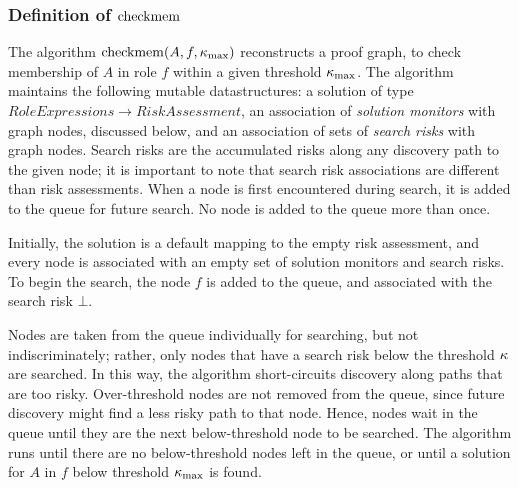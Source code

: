\subsubsection{Definition of $\mathrm{checkmem}$}

\newcommand{\threshold}{\risk_{\mathrm{max}}}

The algorithm $\checkmem(A,f,\threshold)$ reconstructs a proof graph,
to check membership of $A$ in role $f$ within a given threshold
$\threshold$.  The algorithm maintains the following mutable
datastructures: a solution of type $\mathit{RoleExpressions}
\rightarrow \mathit{RiskAssessment}$, an association of \emph{solution
monitors} with graph nodes, discussed below, and an association of
sets of \emph{search risks} with graph nodes.  Search risks are the
accumulated risks along any discovery path to the given node; it is
important to note that search risk associations are different than
risk assessments.  When a node is first encountered during search, it
is added to the queue for future search.  No node is added to the
queue more than once.

Initially, the solution is a default mapping to the empty risk
assessment, and every node is associated with an empty set of solution
monitors and search risks.  To begin the search, the node $f$ is added
to the queue, and associated with the search risk $\bot$.

Nodes are taken from the queue individually for searching, but not
indiscriminately; rather, only nodes that have a search risk below the
threshold $\kappa$ are searched.  In this way, the algorithm
short-circuits discovery along paths that are too risky. 
Over-threshold nodes are not removed from the queue, since
future discovery might find a less risky path to that node.  Hence,
nodes wait in the queue until they are the next below-threshold node
to be searched.  The algorithm runs until there are no below-threshold
nodes left in the queue, or until a solution for $A$ in $f$ 
below threshold $\threshold$ is found.
  
